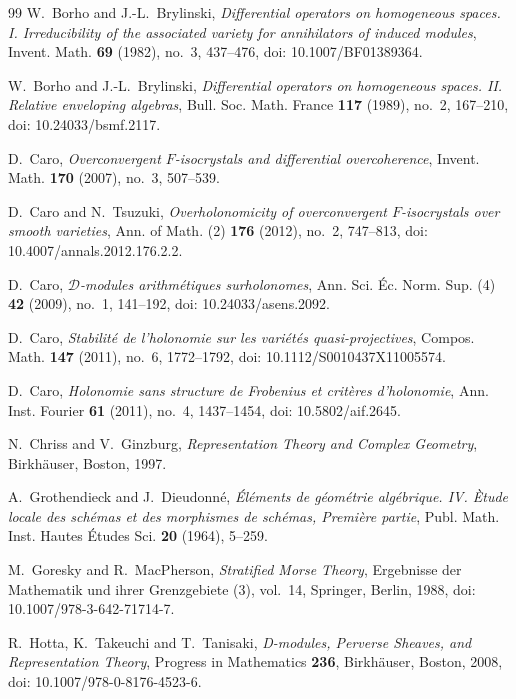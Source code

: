 \documentclass[11pt]{amsart}
\theoremstyle{plain}
\theoremstyle{definition}
\theoremstyle{remark}
\begin{document}
\begin{thebibliography}{99}
W.~Borho and J.-L.~Brylinski,
\emph{Differential operators on homogeneous spaces. I. Irreducibility of the
associated variety for annihilators of induced modules},
Invent. Math. \textbf{69} (1982), no.~3, 437--476,
doi: 10.1007/BF01389364.

W.~Borho and J.-L.~Brylinski,
\emph{Differential operators on homogeneous spaces. II\@. Relative enveloping algebras},
Bull. Soc. Math. France \textbf{117} (1989), no.~2, 167--210,
doi: 10.24033/bsmf.2117.

D.~Caro,
\emph{Overconvergent \(F\)-isocrystals and differential overcoherence},
Invent. Math. \textbf{170} (2007), no.~3, 507--539.


D.~Caro and N.~Tsuzuki,
\emph{Overholonomicity of overconvergent \(F\)-isocrystals over smooth varieties},
Ann. of Math. (2) \textbf{176} (2012), no.~2, 747--813,
doi: 10.4007/annals.2012.176.2.2.

D.~Caro,
\emph{\(\mathcal D\)-modules arithm\'etiques surholonomes},
Ann. Sci. \'Ec. Norm. Sup. (4) \textbf{42} (2009), no.~1, 141--192,
doi: 10.24033/asens.2092.

D.~Caro,
\emph{Stabilit\'e de l'holonomie sur les vari\'et\'es quasi-projectives},
Compos. Math. \textbf{147} (2011), no.~6, 1772--1792,
doi: 10.1112/S0010437X11005574.

D.~Caro,
\emph{Holonomie sans structure de Frobenius et crit\`eres d'holonomie},
Ann. Inst. Fourier \textbf{61} (2011), no.~4, 1437--1454,
doi: 10.5802/aif.2645.

N.~Chriss and V.~Ginzburg,
\emph{Representation Theory and Complex Geometry},
Birkh\"auser, Boston, 1997.

A.~Grothendieck and J.~Dieudonn\'e,
\emph{\'El\'ements de g\'eom\'etrie alg\'ebrique. IV. \`Etude locale des sch\'emas et des morphismes de sch\'emas, Premi\`ere partie},
Publ. Math. Inst. Hautes \'Etudes Sci. \textbf{20} (1964), 5--259.

M.~Goresky and R.~MacPherson,
\emph{Stratified Morse Theory},
Ergebnisse der Mathematik und ihrer Grenzgebiete (3), vol.~14,
Springer, Berlin, 1988,
doi: 10.1007/978-3-642-71714-7.

R.~Hotta, K.~Takeuchi and T.~Tanisaki,
\emph{D-modules, Perverse Sheaves, and Representation Theory},
Progress in Mathematics \textbf{236}, Birkh\"auser, Boston, 2008,
doi: 10.1007/978-0-8176-4523-6.


\end{thebibliography}
\end{document}
